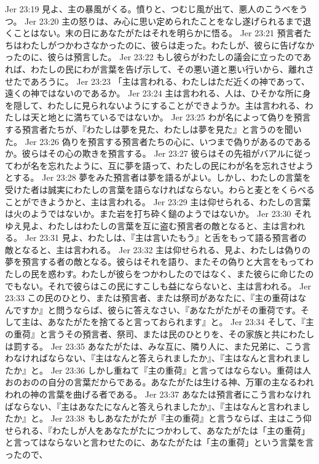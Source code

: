 Jer 23:19  見よ、主の暴風がくる。憤りと、つむじ風が出て、悪人のこうべをうつ。
Jer 23:20  主の怒りは、み心に思い定められたことをなし遂げられるまで退くことはない。末の日にあなたがたはそれを明らかに悟る。
Jer 23:21  預言者たちはわたしがつかわさなかったのに、彼らは走った。わたしが、彼らに告げなかったのに、彼らは預言した。
Jer 23:22  もし彼らがわたしの議会に立ったのであれば、わたしの民にわが言葉を告げ示して、その悪い道と悪い行いから、離れさせたであろうに。
Jer 23:23  「主は言われる、わたしはただ近くの神であって、遠くの神ではないのであるか。
Jer 23:24  主は言われる、人は、ひそかな所に身を隠して、わたしに見られないようにすることができようか。主は言われる、わたしは天と地とに満ちているではないか。
Jer 23:25  わが名によって偽りを預言する預言者たちが、『わたしは夢を見た、わたしは夢を見た』と言うのを聞いた。
Jer 23:26  偽りを預言する預言者たちの心に、いつまで偽りがあるのであるか。彼らはその心の欺きを預言する。
Jer 23:27  彼らはその先祖がバアルに従ってわが名を忘れたように、互に夢を語って、わたしの民にわが名を忘れさせようとする。
Jer 23:28  夢をみた預言者は夢を語るがよい。しかし、わたしの言葉を受けた者は誠実にわたしの言葉を語らなければならない。わらと麦とをくらべることができようかと、主は言われる。
Jer 23:29  主は仰せられる、わたしの言葉は火のようではないか。また岩を打ち砕く鎚のようではないか。
Jer 23:30  それゆえ見よ、わたしはわたしの言葉を互に盗む預言者の敵となると、主は言われる。
Jer 23:31  見よ、わたしは、『主は言いたもう』と舌をもって語る預言者の敵となると、主は言われる。
Jer 23:32  主は仰せられる、見よ、わたしは偽りの夢を預言する者の敵となる。彼らはそれを語り、またその偽りと大言をもってわたしの民を惑わす。わたしが彼らをつかわしたのではなく、また彼らに命じたのでもない。それで彼らはこの民にすこしも益にならないと、主は言われる。
Jer 23:33  この民のひとり、または預言者、または祭司があなたに、『主の重荷はなんですか』と問うならば、彼らに答えなさい、『あなたがたがその重荷です。そして主は、あなたがたを捨てると言っておられます』と。
Jer 23:34  そして、『主の重荷』と言うその預言者、祭司、または民のひとりを、その家族と共にわたしは罰する。
Jer 23:35  あなたがたは、みな互に、隣り人に、また兄弟に、こう言わなければならない、『主はなんと答えられましたか』、『主はなんと言われましたか』と。
Jer 23:36  しかし重ねて『主の重荷』と言ってはならない。重荷は人おのおのの自分の言葉だからである。あなたがたは生ける神、万軍の主なるわれわれの神の言葉を曲げる者である。
Jer 23:37  あなたは預言者にこう言わなければならない、『主はあなたになんと答えられましたか』、『主はなんと言われましたか』と。
Jer 23:38  もしあなたがたが『主の重荷』と言うならば、主はこう仰せられる、『わたしが人をあなたがたにつかわして、あなたがたは「主の重荷」と言ってはならないと言わせたのに、あなたがたは「主の重荷」という言葉を言ったので、
